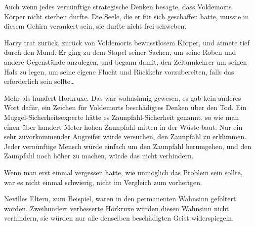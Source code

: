 Auch wenn jedes vernünftige strategische Denken besagte, dass Voldemorts Körper nicht sterben durfte. Die Seele, die er für sich geschaffen hatte, musste in diesem Gehirn verankert sein, sie durfte nicht frei schweben.

Harry trat zurück, zurück von Voldemorts bewusstlosem Körper, und atmete tief durch den Mund. Er ging zu dem Stapel seiner Sachen, um seine Roben und andere Gegenstände anzulegen, und begann damit, den Zeitumkehrer um seinen Hals zu legen, um seine eigene Flucht und Rückkehr vorzubereiten, falls das erforderlich sein sollte…

Mehr als hundert Horkruxe.
Das war wahnsinnig gewesen, es gab kein anderes Wort dafür, ein Zeichen für Voldemorts beschädigtes Denken über den Tod. Ein Muggel-Sicherheitsexperte hätte es Zaunpfahl-Sicherheit genannt, so wie man einen über hundert Meter hohen Zaunpfahl mitten in der Wüste baut. Nur ein sehr zuvorkommender Angreifer würde versuchen, den Zaunpfahl zu erklimmen. Jeder vernünftige Mensch würde einfach um den Zaunpfahl herumgehen, und den Zaunpfahl noch höher zu machen, würde das nicht verhindern.

Wenn man erst einmal vergessen hatte, wie unmöglich das Problem sein sollte, war es nicht einmal schwierig, nicht im Vergleich zum vorherigen.

Nevilles Eltern, zum Beispiel, waren in den permanenten Wahnsinn gefoltert worden. Zweihundert verbesserte Horkruxe würden diesen Wahnsinn nicht verhindern, sie würden nur alle denselben beschädigten Geist widerspiegeln.

